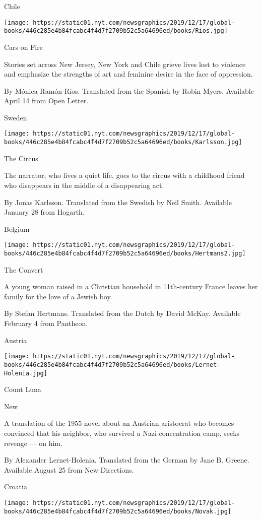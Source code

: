 Chile

\texttt{[image: https://static01.nyt.com/newsgraphics/2019/12/17/global-books/446c285e4b84fcabc4f4d7f2709b52c5a64696ed/books/Rios.jpg]}

Cars on Fire

Stories set across New Jersey, New York and Chile grieve lives lost to
violence and emphasize the strengths of art and feminine desire in the
face of oppression.

 By Mónica Ramón Ríos. Translated from the Spanish by Robin Myers.
Available April 14 from Open Letter.

Sweden

\texttt{[image: https://static01.nyt.com/newsgraphics/2019/12/17/global-books/446c285e4b84fcabc4f4d7f2709b52c5a64696ed/books/Karlsson.jpg]}

The Circus

The narrator, who lives a quiet life, goes to the circus with a
childhood friend who disappears in the middle of a disappearing act.

 By Jonas Karlsson. Translated from the Swedish by Neil Smith. Available
January 28 from Hogarth.

Belgium

\texttt{[image: https://static01.nyt.com/newsgraphics/2019/12/17/global-books/446c285e4b84fcabc4f4d7f2709b52c5a64696ed/books/Hertmans2.jpg]}

The Convert

A young woman raised in a Christian household in 11th-century France
leaves her family for the love of a Jewish boy.

 By Stefan Hertmans. Translated from the Dutch by David McKay. Available
February 4 from Pantheon.

Austria

\texttt{[image: https://static01.nyt.com/newsgraphics/2019/12/17/global-books/446c285e4b84fcabc4f4d7f2709b52c5a64696ed/books/Lernet-Holenia.jpg]}

Count Luna

New

A translation of the 1955 novel about an Austrian aristocrat who becomes
convinced that his neighbor, who survived a Nazi concentration camp,
seeks revenge --- on him.

 By Alexander Lernet-Holenia. Translated from the German by Jane B.
Greene. Available August 25 from New Directions.

Croatia

\texttt{[image: https://static01.nyt.com/newsgraphics/2019/12/17/global-books/446c285e4b84fcabc4f4d7f2709b52c5a64696ed/books/Novak.jpg]}

